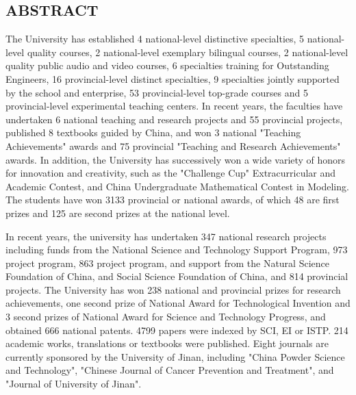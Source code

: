 \begin{ujnabstract*}
\section{ABSTRACT}
\begin{spacing}{1.4}\normalsize{
The University has established 4 national-level distinctive specialties, 5 national-level quality courses, 2 national-level exemplary bilingual courses, 2 national-level quality public audio and video courses, 6 specialties training for Outstanding Engineers, 16 provincial-level distinct specialties, 9 specialties jointly supported by the school and enterprise, 53 provincial-level top-grade courses and 5 provincial-level experimental teaching centers. In recent years, the faculties have undertaken 6 national teaching and research projects and 55 provincial projects, published 8 textbooks guided by China, and won 3 national "Teaching Achievements" awards and 75 provincial "Teaching and Research Achievements" awards. In addition, the University has successively won a wide variety of honors for innovation and creativity, such as the "Challenge Cup" Extracurricular and Academic Contest, and China Undergraduate Mathematical Contest in Modeling. The students have won 3133 provincial or national awards, of which 48 are first prizes and 125 are second prizes at the national level.

In recent years, the university has undertaken 347 national research projects including funds from the National Science and Technology Support Program, 973 project program, 863 project program, and support from the Natural Science Foundation of China, and Social Science Foundation of China, and 814 provincial projects. The University has won 238 national and provincial prizes for research achievements, one second prize of National Award for Technological Invention and 3 second prizes of National Award for Science and Technology Progress, and obtained 666 national patents. 4799 papers were indexed by SCI, EI or ISTP. 214 academic works, translations or textbooks were published. Eight journals are currently sponsored by the University of Jinan, including "China Powder Science and Technology", "Chinese Journal of Cancer Prevention and Treatment", and "Journal of University of Jinan".
}\end{spacing}
\begin{spacing}{0.9}
\small{}
\end{spacing}
\end{ujnabstract*}
